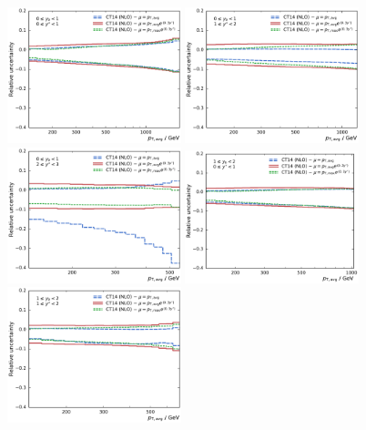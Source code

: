 \begin{figure}[htp]
    \centering
    \includegraphics[width=0.45\textwidth]{figures/theory/scale_uncert_comp_yb0ys0.pdf}\hfill
    \includegraphics[width=0.45\textwidth]{figures/theory/scale_uncert_comp_yb0ys1.pdf}
    \includegraphics[width=0.45\textwidth]{figures/theory/scale_uncert_comp_yb0ys2.pdf}\hfill
    \includegraphics[width=0.45\textwidth]{figures/theory/scale_uncert_comp_yb1ys0.pdf}
    \includegraphics[width=0.45\textwidth]{figures/theory/scale_uncert_comp_yb1ys1.pdf}\hfill

\end{figure}
